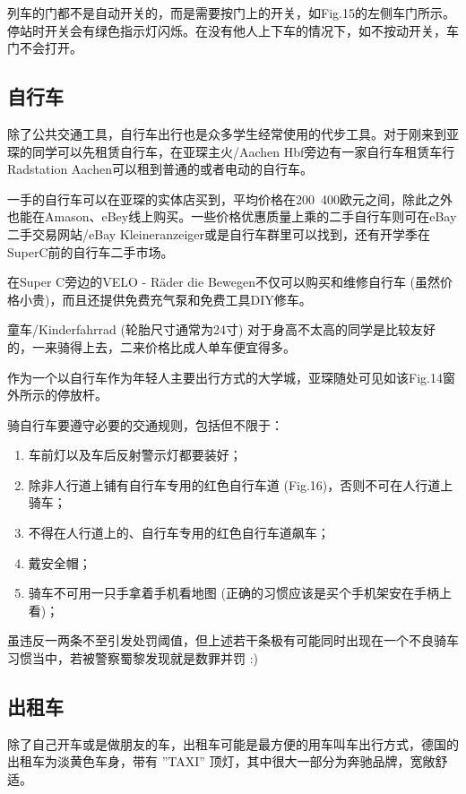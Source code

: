     列车的门都不是自动开关的，而是需要按门上的开关，如Fig.15的左侧车门所示。停站时开关会有绿色指示灯闪烁。在没有他人上下车的情况下，如不按动开关，车门不会打开。 

  \subsection{自行车}\label{subsec:自行车}

    除了公共交通工具，自行车出行也是众多学生经常使用的代步工具。对于刚来到亚琛的同学可以先租赁自行车，在亚琛主火/Aachen Hbf旁边有一家自行车租赁车行Radstation Aachen可以租到普通的或者电动的自行车。

    一手的自行车可以在亚琛的实体店买到，平均价格在200~400欧元之间，除此之外也能在Amason、eBey线上购买。一些价格优惠质量上乘的二手自行车则可在eBay二手交易网站/eBay Kleineranzeiger或是自行车群里可以找到，还有开学季在SuperC前的自行车二手市场。

    在Super C旁边的VELO - Räder die Bewegen不仅可以购买和维修自行车 (虽然价格小贵)，而且还提供免费充气泵和免费工具DIY修车。

    童车/Kinderfahrrad (轮胎尺寸通常为24寸) 对于身高不太高的同学是比较友好的，一来骑得上去，二来价格比成人单车便宜得多。

    作为一个以自行车作为年轻人主要出行方式的大学城，亚琛随处可见如该Fig.14窗外所示的停放杆。

    骑自行车要遵守必要的交通规则，包括但不限于：

    \begin{enumerate}
      \item 车前灯以及车后反射警示灯都要装好；
      \item 除非人行道上铺有自行车专用的红色自行车道 (Fig.16)，否则不可在人行道上骑车；
      \item 不得在人行道上的、自行车专用的红色自行车道飙车；
      \item 戴安全帽；
      \item 骑车不可用一只手拿着手机看地图 (正确的习惯应该是买个手机架安在手柄上看)；
    \end{enumerate}

    虽违反一两条不至引发处罚阈值，但上述若干条极有可能同时出现在一个不良骑车习惯当中，若被警察蜀黎发现就是数罪并罚 :)

  \subsection{出租车}\label{subsec:出租车}

    除了自己开车或是做朋友的车，出租车可能是最方便的用车叫车出行方式，德国的出租车为淡黄色车身，带有 ”TAXI” 顶灯，其中很大一部分为奔驰品牌，宽敞舒适。

